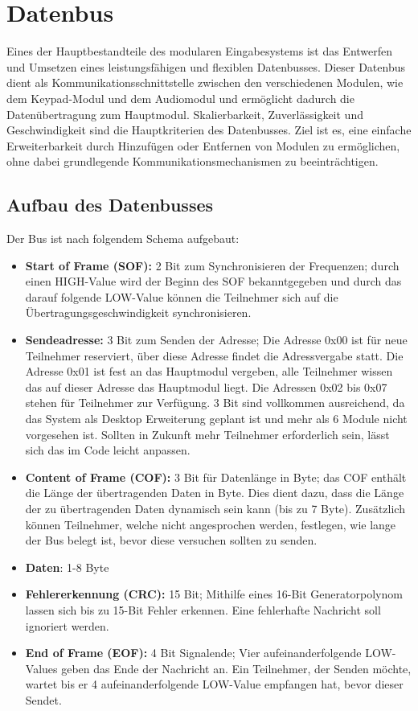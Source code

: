 \section{Datenbus}
Eines der Hauptbestandteile des modularen Eingabesystems ist das Entwerfen und Umsetzen eines leistungsfähigen und flexiblen Datenbusses. Dieser Datenbus dient als Kommunikationsschnittstelle zwischen den verschiedenen Modulen, wie dem Keypad-Modul und dem Audiomodul und ermöglicht dadurch die Datenübertragung zum Hauptmodul. Skalierbarkeit, Zuverlässigkeit und Geschwindigkeit sind die Hauptkriterien des Datenbusses. Ziel ist es, eine einfache Erweiterbarkeit durch Hinzufügen oder Entfernen von Modulen zu ermöglichen, ohne dabei grundlegende Kommunikationsmechanismen zu beeinträchtigen.

\subsection{Aufbau des Datenbusses}
Der Bus ist nach folgendem Schema aufgebaut:
\begin{itemize}
	\item \textbf{Start of Frame (SOF):} 2 Bit zum Synchronisieren der Frequenzen; durch einen HIGH-Value wird der Beginn des SOF bekanntgegeben und durch das darauf folgende LOW-Value können die Teilnehmer sich auf die Übertragungsgeschwindigkeit synchronisieren.
	\item \textbf{Sendeadresse:} 3 Bit zum Senden der Adresse; Die Adresse 0x00 ist für neue Teilnehmer reserviert, über diese Adresse findet die Adressvergabe statt. Die Adresse 0x01 ist fest an das Hauptmodul vergeben, alle Teilnehmer wissen das auf dieser Adresse das Hauptmodul liegt. Die Adressen 0x02 bis 0x07 stehen für Teilnehmer zur Verfügung. 3 Bit sind vollkommen ausreichend, da das System als Desktop Erweiterung geplant ist und mehr als 6 Module nicht vorgesehen ist. Sollten in Zukunft mehr Teilnehmer erforderlich sein, lässt sich das im Code leicht anpassen.
	\item \textbf{Content of Frame (COF):} 3 Bit für Datenlänge in Byte; das COF enthält die Länge der übertragenden Daten in Byte. Dies dient dazu, dass die Länge der zu übertragenden Daten dynamisch sein kann (bis zu 7 Byte). Zusätzlich können Teilnehmer, welche nicht angesprochen werden, festlegen, wie lange der Bus belegt ist, bevor diese versuchen sollten zu senden.
	\item \textbf{Daten}: 1-8 Byte
	\item \textbf{Fehlererkennung (CRC):} 15 Bit; Mithilfe eines 16-Bit Generatorpolynom lassen sich bis zu 15-Bit Fehler erkennen. Eine fehlerhafte Nachricht soll ignoriert werden. 
	\item \textbf{End of Frame (EOF):} 4 Bit Signalende; Vier aufeinanderfolgende LOW-Values geben das Ende der Nachricht an. Ein Teilnehmer, der Senden möchte, wartet bis er 4 aufeinanderfolgende LOW-Value empfangen hat, bevor dieser Sendet.
\end{itemize}


